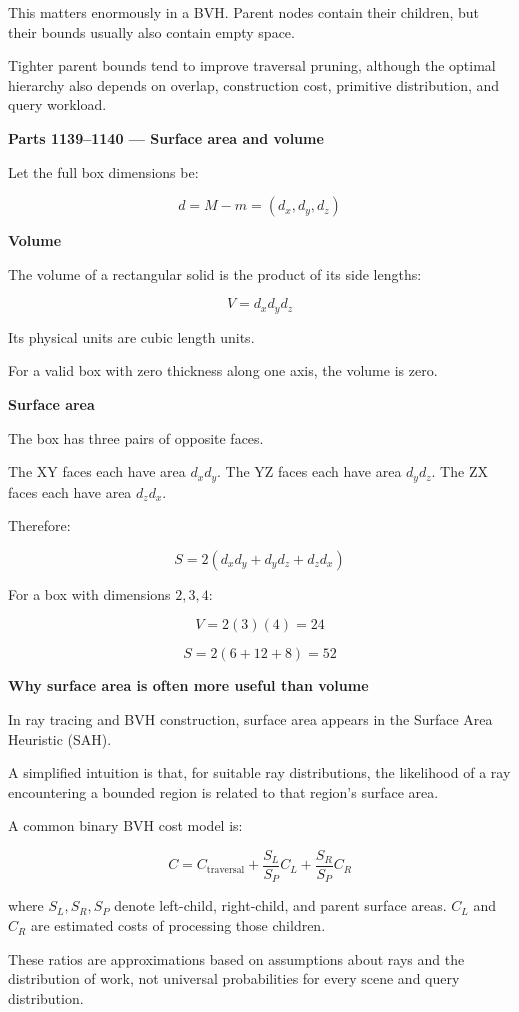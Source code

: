 This matters enormously in a BVH. Parent nodes contain their children, but their bounds usually also contain empty space.

Tighter parent bounds tend to improve traversal pruning, although the optimal hierarchy also depends on overlap, construction cost, primitive distribution, and query workload.

\textbf{Parts 1139--1140 --- Surface area and volume}

Let the full box dimensions be:

\[
d=M-m=(d_x,d_y,d_z)
\]

\textbf{Volume}

The volume of a rectangular solid is the product of its side lengths:

\[
\boxed{ V=d_xd_yd_z }
\]

Its physical units are cubic length units.

For a valid box with zero thickness along one axis, the volume is zero.

\textbf{Surface area}

The box has three pairs of opposite faces.

The XY faces each have area \(d_xd_y\). The YZ faces each have area \(d_yd_z\). The ZX faces each have area \(d_zd_x\).

Therefore:

\[
\boxed{ S=2(d_xd_y+d_yd_z+d_zd_x) }
\]

For a box with dimensions \(2,3,4\):

\[
V=2(3)(4)=24
\]

\[
S=2(6+12+8)=52
\]

\textbf{Why surface area is often more useful than volume}

In ray tracing and BVH construction, surface area appears in the Surface Area Heuristic (SAH).

A simplified intuition is that, for suitable ray distributions, the likelihood of a ray encountering a bounded region is related to that region's surface area.

A common binary BVH cost model is:

\[
C= C_{\mathrm{traversal}} + \frac{S_L}{S_P}C_L + \frac{S_R}{S_P}C_R
\]

where \(S_L,S_R,S_P\) denote left-child, right-child, and parent surface areas. \(C_L\) and \(C_R\) are estimated costs of processing those children.

These ratios are approximations based on assumptions about rays and the distribution of work, not universal probabilities for every scene and query distribution.

